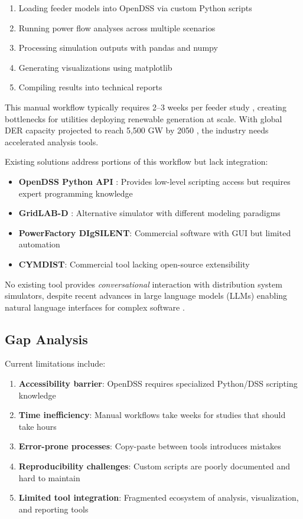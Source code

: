 \documentclass[review]{elsarticle}
\begin{document}
\begin{enumerate}
    \item Loading feeder models into OpenDSS via custom Python scripts
    \item Running power flow analyses across multiple scenarios
    \item Processing simulation outputs with pandas and numpy
    \item Generating visualizations using matplotlib
    \item Compiling results into technical reports
\end{enumerate}

This manual workflow typically requires 2--3 weeks per feeder study \cite{ebe2016distribution}, creating bottlenecks for utilities deploying renewable generation at scale. With global DER capacity projected to reach 5,500 GW by 2050 \cite{irena2019future}, the industry needs accelerated analysis tools.

Existing solutions address portions of this workflow but lack integration:
\begin{itemize}
    \item \textbf{OpenDSS Python API} \cite{dugan2012opendss}: Provides low-level scripting access but requires expert programming knowledge
    \item \textbf{GridLAB-D} \cite{chassin2008gridlab}: Alternative simulator with different modeling paradigms
    \item \textbf{PowerFactory DIgSILENT}: Commercial software with GUI but limited automation
    \item \textbf{CYMDIST}: Commercial tool lacking open-source extensibility
\end{itemize}

No existing tool provides \textit{conversational} interaction with distribution system simulators, despite recent advances in large language models (LLMs) enabling natural language interfaces for complex software \cite{brown2020language,anthropic2024claude}.

\subsection{Gap Analysis}

Current limitations include:
\begin{enumerate}
    \item \textbf{Accessibility barrier}: OpenDSS requires specialized Python/DSS scripting knowledge
    \item \textbf{Time inefficiency}: Manual workflows take weeks for studies that should take hours
    \item \textbf{Error-prone processes}: Copy-paste between tools introduces mistakes
    \item \textbf{Reproducibility challenges}: Custom scripts are poorly documented and hard to maintain
    \item \textbf{Limited tool integration}: Fragmented ecosystem of analysis, visualization, and reporting tools
\end{enumerate}
\end{document}
